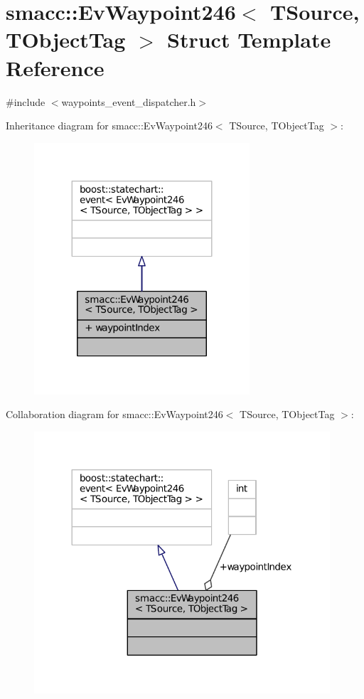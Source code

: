 \hypertarget{structsmacc_1_1EvWaypoint246}{}\section{smacc\+:\+:Ev\+Waypoint246$<$ T\+Source, T\+Object\+Tag $>$ Struct Template Reference}
\label{structsmacc_1_1EvWaypoint246}


{\ttfamily \#include $<$waypoints\+\_\+event\+\_\+dispatcher.\+h$>$}



Inheritance diagram for smacc\+:\+:Ev\+Waypoint246$<$ T\+Source, T\+Object\+Tag $>$\+:
\nopagebreak
\begin{figure}[H]
\begin{center}
\leavevmode
\includegraphics[width=227pt]{structsmacc_1_1EvWaypoint246__inherit__graph}
\end{center}
\end{figure}


Collaboration diagram for smacc\+:\+:Ev\+Waypoint246$<$ T\+Source, T\+Object\+Tag $>$\+:
\nopagebreak
\begin{figure}[H]
\begin{center}
\leavevmode
\includegraphics[width=312pt]{structsmacc_1_1EvWaypoint246__coll__graph}
\end{center}
\end{figure}
